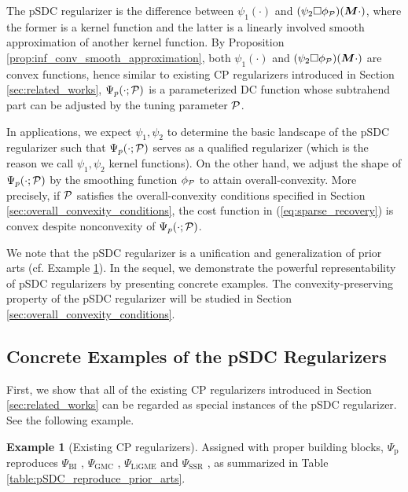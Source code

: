 \documentclass[lettersize,journal]{IEEEtran}
\theoremstyle{plain}%
\theoremstyle{definition}
\newtheorem{example}{Example}
\theoremstyle{remark}
\begin{document}
The pSDC regularizer is the difference between $\psi_1(\cdot)$ and $(\psi_2\Box\phi_{\mathcal{P}})(\bm{M}\cdot)$, where the former is a kernel function and the latter is a linearly involved smooth approximation of another kernel function. By Proposition \ref{prop:inf_conv_smooth_approximation}, both $\psi_1(\cdot)$ and $(\psi_2\Box\phi_{\mathcal{P}})(\bm{M}\cdot)$ are convex functions, hence similar to existing CP regularizers introduced in Section \ref{sec:related_works}, $\Psi_{{p}}(\cdot;\mathcal{P})$ is a parameterized DC function whose subtrahend part can be adjusted by the tuning parameter $\mathcal{P}$.

In applications, we expect $\psi_1,\psi_2$ to determine the basic landscape of the pSDC regularizer such that $\Psi_{{p}}(\cdot;\mathcal{P})$ serves as a qualified regularizer (which is the reason we call $\psi_1,\psi_2$ kernel functions). On the other hand, we adjust the shape of $\Psi_{{p}}(\cdot;\mathcal{P})$ by the smoothing function $\phi_{\mathcal{P}}$ to attain overall-convexity.
More precisely, if $\mathcal{P}$ satisfies the overall-convexity conditions specified in Section \ref{sec:overall_convexity_conditions}, the cost function in (\ref{eq:sparse_recovery}) is convex despite nonconvexity of $\Psi_{{p}}(\cdot;\mathcal{P})$.

We note that the pSDC regularizer is a unification and generalization of prior arts (cf. Example \ref{exp:existing_CP_sparse_regularizers}). In the sequel, we demonstrate the powerful representability of pSDC regularizers by presenting concrete examples. The convexity-preserving property of the pSDC regularizer will be studied in Section \ref{sec:overall_convexity_conditions}.


\subsection{Concrete Examples of the pSDC Regularizers}



First, we show that all of the existing CP regularizers introduced in Section \ref{sec:related_works} can be regarded as special instances of the pSDC regularizer. See the following example.

\begin{example}[Existing CP regularizers]\label{exp:existing_CP_sparse_regularizers}
Assigned with proper building blocks, $\Psi_{\mathrm{p}}$ reproduces $\Psi_{\mathrm{BI}}$ \cite{nikolova1998}, $\Psi_{\mathrm{GMC}}$ \cite{selesnick2017}, $\Psi_{\mathrm{LiGME}}$ \cite{abe2020} and $\Psi_{\mathrm{SSR}}$ \cite{alshabili2021}, as summarized in Table \ref{table:pSDC_reproduce_prior_arts}.
\end{example}
\end{document}
